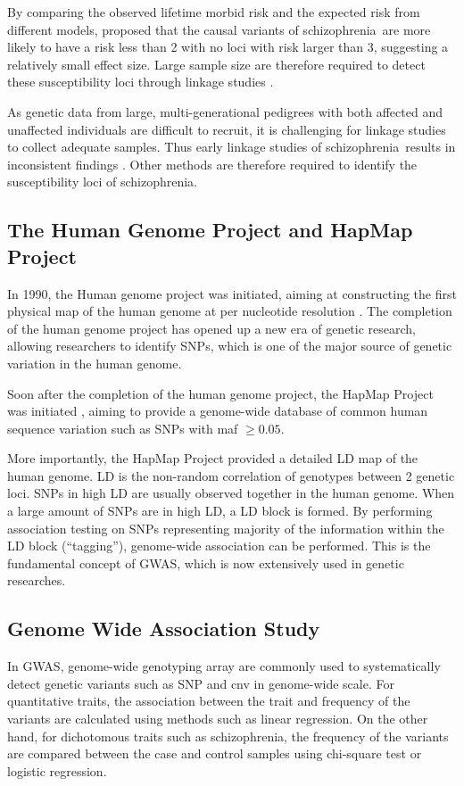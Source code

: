 \documentclass[12pt]{scrbook}
\newcommand*{\scz}{schizophrenia}
\begin{document}
By comparing the observed lifetime morbid risk and the expected risk from different models, \citet{Risch1990} proposed that the causal variants of \scz\ are more likely to have a risk less than 2 with no loci with risk larger than 3, suggesting a relatively small effect size.
Large sample size are therefore required to detect these susceptibility loci through linkage studies \citep{Risch1990}.

As genetic data from large, multi-generational pedigrees with both affected and unaffected individuals are difficult to recruit, it is challenging for linkage studies to collect adequate samples. 
Thus early linkage studies of \scz\ results in inconsistent findings \citep{Harrison2005}.
Other methods are therefore required to identify the susceptibility loci of \scz.

\subsection{The Human Genome Project and HapMap Project}
In 1990, the Human genome project was initiated, aiming at constructing the first physical map of the human genome at per nucleotide resolution \citep{Lander2001}.
The completion of the human genome project has opened up a new era of genetic research, allowing researchers to identify \glspl{SNP}, which is one of the major source of genetic variation in the human genome.

Soon after the completion of the human genome project, the HapMap Project was initiated \citep{Consortium2005}, aiming to provide a genome-wide database of common human sequence variation such as \glspl{SNP} with \gls{maf} $\ge0.05$.

More importantly, the HapMap Project provided a detailed \gls{LD} map of the human genome.
\gls{LD} is the non-random correlation of genotypes between 2 genetic loci. 
\glspl{SNP} in high \gls{LD} are usually observed together in the human genome.
When a large amount of \glspl{SNP} are in high \gls{LD}, a \gls{LD} block is formed.
By performing association testing on \glspl{SNP} representing majority of the information within the \gls{LD} block (``tagging''), genome-wide association can be performed.
This is the fundamental concept of \gls{GWAS}, which is now extensively used in genetic researches.

\subsection{Genome Wide Association Study}
In \gls{GWAS}, genome-wide genotyping array are commonly used to systematically detect genetic variants such as \gls{SNP} and \gls{cnv} in genome-wide scale.
For quantitative traits, the association between the trait and frequency of the variants are calculated using methods such as linear regression.
On the other hand, for dichotomous traits such as \scz, the frequency of the variants are compared between the case and control samples using chi-square test or logistic regression.
\end{document}
